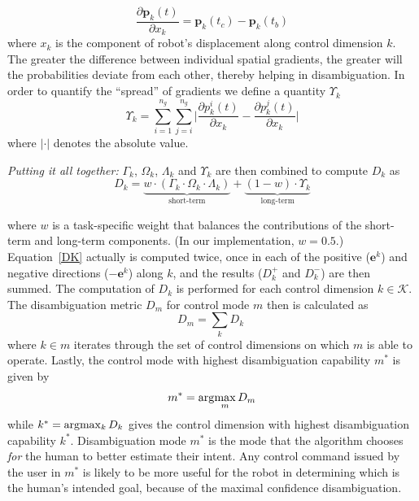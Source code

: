 \begin{equation*}
\frac{\partial\boldsymbol{p}_k(t)}{\partial x_k} = \boldsymbol{p}_k(t_c) - \boldsymbol{p}_k(t_b)
\end{equation*}
where $x_k$ is the component of robot's displacement along control dimension $k$. The greater the difference between individual spatial gradients, the greater will the probabilities deviate from each other, thereby helping in disambiguation. In order to quantify the ``spread'' of gradients we define a quantity $\Upsilon_k$ 
\begin{equation}
\Upsilon_k = \sum_{i=1}^{n_g}\sum_{j=i}^{n_g}\Big \lvert\frac{\partial p^i_k(t)}{\partial x_k} - \frac{\partial p^j_k(t)}{\partial x_k}\Big \rvert
\end{equation}
where $\lvert\cdot\rvert$ denotes the absolute value. 

\textit{Putting it all together:}
$\Gamma_k$, $\Omega_k$, $\Lambda_k$ and $\Upsilon_k$ are then combined to compute $D_{k}$ as 
\begin{equation}\label{DK}
D_{k} = \underbrace{w\cdot(\Gamma_k\cdot \Omega_k\cdot\Lambda_k)}_{\text{short-term}} + \underbrace{(1 - w)\cdot \Upsilon_k}_{\text{long-term}}
\end{equation}

where $w$ is a task-specific weight that balances the contributions of the short-term and long-term components. (In our implementation, $w=0.5$.) Equation~\ref{DK} actually is computed twice, once in each of the positive ($\boldsymbol{e}^k$) and negative directions ($-\boldsymbol{e}^k$) along $k$, and the results ($D_k^+$ and $D_k^-$) are then summed. The computation of $D_k$ is performed for each control dimension $k \in \mathcal{K}$. The disambiguation metric $D_m$ for control mode $m$ then is calculated as 
\begin{equation*}\label{EQ2}
D_m = \sum_{k} D_{k} \;
\end{equation*}
where $k \in m$ iterates through the set of control dimensions on which $m$ is able to operate.
Lastly, the control mode with highest disambiguation capability $m^*$ is given by
\begin{equation*}
m^* = \arg\!\max_m  D_{m}
\end{equation*}
while $k^* = \arg\!\max_k D_k$ gives the control dimension with highest disambiguation capability $k^{*}$.
Disambiguation mode $m^{*}$ is the mode that the algorithm chooses \textit{for} the human to better estimate their intent. Any control command issued by the user in $m^*$ is likely to be more useful for the robot in determining which is the human's intended goal, because of the maximal confidence disambiguation.

